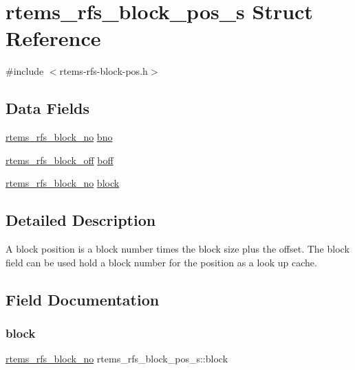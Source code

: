 \hypertarget{structrtems__rfs__block__pos__s}{}\section{rtems\+\_\+rfs\+\_\+block\+\_\+pos\+\_\+s Struct Reference}
\label{structrtems__rfs__block__pos__s}


{\ttfamily \#include $<$rtems-\/rfs-\/block-\/pos.\+h$>$}

\subsection*{Data Fields}
\begin{DoxyCompactItemize}
\item 
\mbox{\hyperlink{rtems-rfs-block-pos_8h_abbf8bb95acf9bd16ed3291f7da518e9a}{rtems\+\_\+rfs\+\_\+block\+\_\+no}} \mbox{\hyperlink{structrtems__rfs__block__pos__s_a6b59418fa37afb4f25adb19bbeb91ee6}{bno}}
\item 
\mbox{\hyperlink{rtems-rfs-block-pos_8h_ad32ba1f9be3b667fe3e778d0edfdfff3}{rtems\+\_\+rfs\+\_\+block\+\_\+off}} \mbox{\hyperlink{structrtems__rfs__block__pos__s_a319d593b6830727b0ee710fe88a05bff}{boff}}
\item 
\mbox{\hyperlink{rtems-rfs-block-pos_8h_abbf8bb95acf9bd16ed3291f7da518e9a}{rtems\+\_\+rfs\+\_\+block\+\_\+no}} \mbox{\hyperlink{structrtems__rfs__block__pos__s_ae64bdde4fbb909147ee40b0c7e23c38b}{block}}
\end{DoxyCompactItemize}


\subsection{Detailed Description}
A block position is a block number times the block size plus the offset. The block field can be used hold a block number for the position as a look up cache. 

\subsection{Field Documentation}
\mbox{\label{structrtems__rfs__block__pos__s_ae64bdde4fbb909147ee40b0c7e23c38b}} 
\subsubsection{\texorpdfstring{block}{block}}
{\footnotesize\ttfamily \mbox{\hyperlink{rtems-rfs-block-pos_8h_abbf8bb95acf9bd16ed3291f7da518e9a}{rtems\+\_\+rfs\+\_\+block\+\_\+no}} rtems\+\_\+rfs\+\_\+block\+\_\+pos\+\_\+s\+::block}

